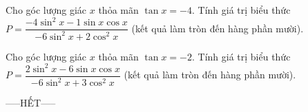 \documentclass[12pt,a4paper]{article}
\begin{document}
\begin{ex}
 Cho góc lượng giác ${x}$ thỏa mãn $\tan x=-4$. Tính giá trị biểu thức $P=\dfrac{-4\sin^2 x -1\sin x \cos x}{-6\sin^2x+2\cos^2x}$ (kết quả làm tròn đến hàng phần mười).\\ 

\end{ex}

\begin{ex}
 Cho góc lượng giác ${x}$ thỏa mãn $\tan x=-2$. Tính giá trị biểu thức $P=\dfrac{2\sin^2 x -6\sin x \cos x}{-6\sin^2x+3\cos^2x}$ (kết quả làm tròn đến hàng phần mười).\\ 

\end{ex}


 \begin{center}
-----HẾT-----
\end{center}

\newpage 
\end{document}
